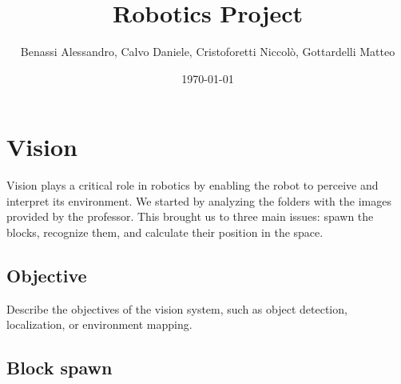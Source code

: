 \documentclass[12pt,a4paper]{article}
\title{Robotics Project}
\author{Benassi Alessandro, Calvo Daniele, Cristoforetti Niccolò, Gottardelli Matteo}
\date{\today}
\begin{document}
\maketitle
\tableofcontents
\newpage

\section{Vision}\label{sec:vision}
Vision plays a critical role in robotics by enabling the robot to perceive and interpret its environment. 
We started by analyzing the folders with the images provided by the professor. This brought us to three main issues: spawn the blocks, recognize them, and calculate their position in the space. 

\subsection{Objective}\label{subsec:vobj}
Describe the objectives of the vision system, such as object detection, localization, or environment mapping.

\subsection{Block spawn}\label{subsec:blockspawn}
\end{document}
